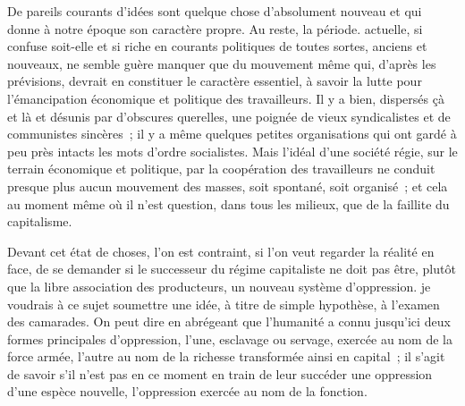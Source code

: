 \documentclass[french,twoside]{book} %
\begin{document}
De pareils courants d'idées sont quelque chose d'absolument nouveau et qui donne à notre époque son caractère propre. Au reste, la période. actuelle, si confuse soit-elle et si riche en courants politiques de toutes sortes, anciens et nouveaux, ne semble guère manquer que du mouvement même qui, d'après les prévisions, devrait en constituer le caractère essentiel, à savoir la lutte pour l'émancipation économique et politique des travailleurs. Il y a bien, dispersés çà et là et désunis par d'obscures querelles, une poignée de vieux syndicalistes et de communistes sincères ; il y a même quelques petites organisations qui ont gardé à peu près intacts les mots d'ordre socialistes. Mais l'idéal d'une société régie, sur le terrain économique et politique, par la coopération des travailleurs ne conduit presque plus aucun mouvement des masses, soit spontané, soit organisé ; et cela au moment même où il n'est question, dans tous les milieux, que de la faillite du capitalisme.\par
Devant cet état de choses, l'on est contraint, si l'on veut regarder la réalité en face, de se demander si le successeur du régime capitaliste ne doit pas être, plutôt que la libre association des producteurs, un nouveau système d'oppression. je voudrais à ce sujet soumettre une idée, à titre de simple hypothèse, à l'examen des camarades. On peut dire en abrégeant que l'humanité a connu jusqu'ici deux formes principales d'oppression, l'une, esclavage ou servage, exercée au nom de la force armée, l'autre au nom de la richesse transformée ainsi en capital ; il s'agit de savoir s'il n'est pas en ce moment en train de leur succéder une oppression d'une espèce nouvelle, l'oppression exercée au nom de la fonction.\par
\end{document}
